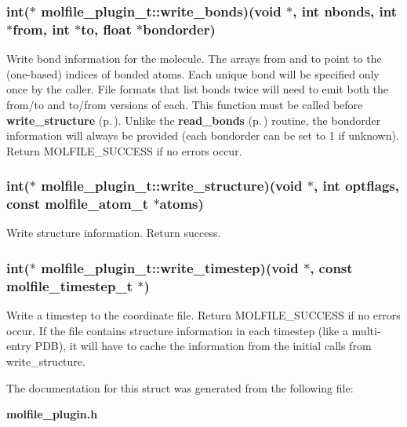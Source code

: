 \subsubsection{\setlength{\rightskip}{0pt plus 5cm}int($\ast$  molfile\_\-plugin\_\-t::write\_\-bonds)(void $\ast$, int nbonds, int $\ast$from, int $\ast$to, float $\ast$bondorder)}\label{structmolfile__plugin__t_m14}


Write bond information for the molecule. The arrays from and to point to the (one-based) indices of bonded atoms. Each unique bond will be specified only once by the caller.  File formats that list bonds twice will need to emit both the  from/to and to/from versions of each. This function must be called before {\bf write\_\-structure} {\rm (p.\,\pageref{structmolfile__plugin__t_m7})}.  Unlike the {\bf read\_\-bonds} {\rm (p.\,\pageref{structmolfile__plugin__t_m3})} routine, the bondorder information will always be provided (each bondorder can be set to 1 if unknown). Return MOLFILE\_\-SUCCESS if no errors occur. 
\subsubsection{\setlength{\rightskip}{0pt plus 5cm}int($\ast$  molfile\_\-plugin\_\-t::write\_\-structure)(void $\ast$, int optflags, const {\bf molfile\_\-atom\_\-t} $\ast$atoms)}\label{structmolfile__plugin__t_m7}


Write structure information. Return success. 
\subsubsection{\setlength{\rightskip}{0pt plus 5cm}int($\ast$  molfile\_\-plugin\_\-t::write\_\-timestep)(void $\ast$, const {\bf molfile\_\-timestep\_\-t} $\ast$)}\label{structmolfile__plugin__t_m8}


Write a timestep to the coordinate file. Return MOLFILE\_\-SUCCESS if no errors occur. If the file contains structure information in each  timestep (like a multi-entry PDB), it will have to cache the information  from the initial calls from write\_\-structure. 

The documentation for this struct was generated from the following file:\begin{CompactItemize}
\item 
{\bf molfile\_\-plugin.h}\end{CompactItemize}
